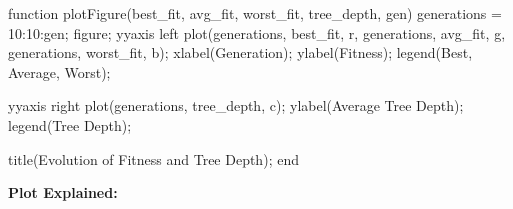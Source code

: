 \documentclass[
  letterpaper,
  DIV=11,
  numbers=noendperiod]{scrartcl}
\newenvironment{Shaded}{\begin{snugshade}}{\end{snugshade}}
\newcommand{\FloatTok}[1]{\textcolor[rgb]{0.68,0.00,0.00}{#1}}
\newcommand{\KeywordTok}[1]{\textcolor[rgb]{0.00,0.23,0.31}{#1}}
\newcommand{\NormalTok}[1]{\textcolor[rgb]{0.00,0.23,0.31}{#1}}
\newcommand{\OperatorTok}[1]{\textcolor[rgb]{0.37,0.37,0.37}{#1}}
\newcommand{\SpecialStringTok}[1]{\textcolor[rgb]{0.13,0.47,0.30}{#1}}
\newcommand{\VariableTok}[1]{\textcolor[rgb]{0.07,0.07,0.07}{#1}}
\begin{document}
\begin{Shaded}
\begin{Highlighting}[]
\KeywordTok{function} \VariableTok{plotFigure}\NormalTok{(}\VariableTok{best\_fit}\OperatorTok{,} \VariableTok{avg\_fit}\OperatorTok{,} \VariableTok{worst\_fit}\OperatorTok{,} \VariableTok{tree\_depth}\OperatorTok{,} \VariableTok{gen}\NormalTok{)}
    \VariableTok{generations} \OperatorTok{=} \FloatTok{10}\OperatorTok{:}\FloatTok{10}\OperatorTok{:}\VariableTok{gen}\OperatorTok{;}
    \VariableTok{figure}\OperatorTok{;}
    \VariableTok{yyaxis} \VariableTok{left}
    \VariableTok{plot}\NormalTok{(}\VariableTok{generations}\OperatorTok{,} \VariableTok{best\_fit}\OperatorTok{,} \SpecialStringTok{\textquotesingle{}r\textquotesingle{}}\OperatorTok{,} \VariableTok{generations}\OperatorTok{,} \VariableTok{avg\_fit}\OperatorTok{,} \SpecialStringTok{\textquotesingle{}g\textquotesingle{}}\OperatorTok{,} \VariableTok{generations}\OperatorTok{,} \VariableTok{worst\_fit}\OperatorTok{,} \SpecialStringTok{\textquotesingle{}b\textquotesingle{}}\NormalTok{)}\OperatorTok{;}
    \VariableTok{xlabel}\NormalTok{(}\SpecialStringTok{\textquotesingle{}Generation\textquotesingle{}}\NormalTok{)}\OperatorTok{;}
    \VariableTok{ylabel}\NormalTok{(}\SpecialStringTok{\textquotesingle{}Fitness\textquotesingle{}}\NormalTok{)}\OperatorTok{;}
    \VariableTok{legend}\NormalTok{(}\SpecialStringTok{\textquotesingle{}Best\textquotesingle{}}\OperatorTok{,} \SpecialStringTok{\textquotesingle{}Average\textquotesingle{}}\OperatorTok{,} \SpecialStringTok{\textquotesingle{}Worst\textquotesingle{}}\NormalTok{)}\OperatorTok{;}
    
    \VariableTok{yyaxis} \VariableTok{right}
    \VariableTok{plot}\NormalTok{(}\VariableTok{generations}\OperatorTok{,} \VariableTok{tree\_depth}\OperatorTok{,} \SpecialStringTok{\textquotesingle{}c\textquotesingle{}}\NormalTok{)}\OperatorTok{;}
    \VariableTok{ylabel}\NormalTok{(}\SpecialStringTok{\textquotesingle{}Average Tree Depth\textquotesingle{}}\NormalTok{)}\OperatorTok{;}
    \VariableTok{legend}\NormalTok{(}\SpecialStringTok{\textquotesingle{}Tree Depth\textquotesingle{}}\NormalTok{)}\OperatorTok{;}
    
    \VariableTok{title}\NormalTok{(}\SpecialStringTok{\textquotesingle{}Evolution of Fitness and Tree Depth\textquotesingle{}}\NormalTok{)}\OperatorTok{;}
\KeywordTok{end}
\end{Highlighting}
\end{Shaded}

\textbf{Plot Explained:}
\end{document}
